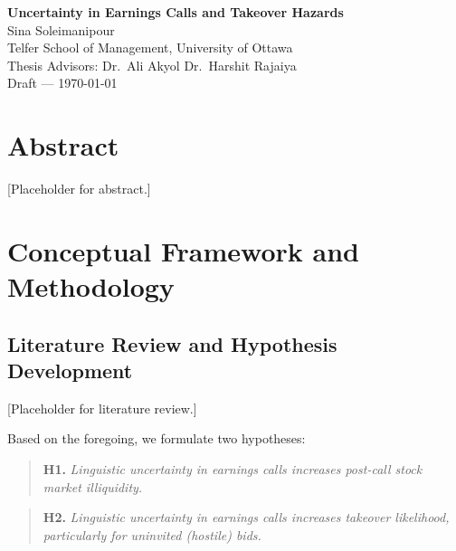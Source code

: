 \documentclass[12pt,a4paper]{article}
\begin{document}
\begin{titlepage}
\null\vfill
\begin{center}
{\LARGE \textbf{Uncertainty in Earnings Calls and Takeover Hazards}} \\[1.5em]
{\large Sina Soleimanipour} \\[0.5em]
{\normalsize Telfer School of Management, University of Ottawa} \\[1.5em]
{\normalsize Thesis Advisors: Dr.\ Ali Akyol \quad Dr.\ Harshit Rajaiya} \\[1em]
{\normalsize Draft — \today}
\end{center}
\vfill
\end{titlepage}

\section{Abstract}
\label{sec:abstract}

[Placeholder for abstract.]

\section{Conceptual Framework and Methodology}
\label{sec:framework}

\subsection{Literature Review and Hypothesis Development}
\label{sec:litreview}

[Placeholder for literature review.]

Based on the foregoing, we formulate two hypotheses:

\begin{quote}
\textbf{H1.} \textit{Linguistic uncertainty in earnings calls increases post-call stock market illiquidity.}
\end{quote}

\begin{quote}
\textbf{H2.} \textit{Linguistic uncertainty in earnings calls increases takeover likelihood, particularly for uninvited (hostile) bids.}
\end{quote}
\end{document}
